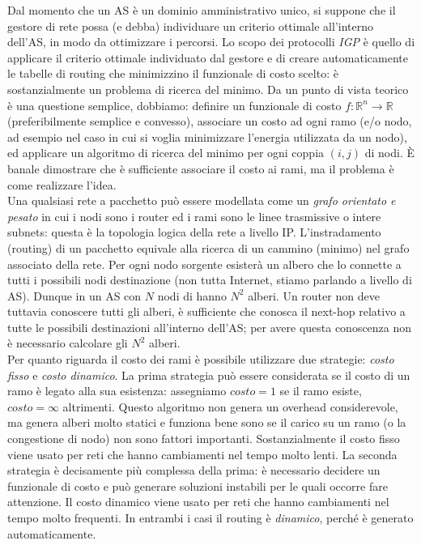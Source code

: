 Dal momento che un AS è un dominio amministrativo unico, si suppone che il gestore di rete possa (e debba) individuare un criterio ottimale all'interno dell'AS, in modo da ottimizzare i percorsi. Lo scopo dei protocolli \textit{IGP} è quello di applicare il criterio ottimale individuato dal gestore e di creare automaticamente le tabelle di routing che minimizzino il funzionale di costo scelto: è sostanzialmente un problema di ricerca del minimo. Da un punto di vista teorico è una questione semplice, dobbiamo: definire un funzionale di costo $f:\mathbb{R}^n\to\mathbb{R}$ (preferibilmente semplice e convesso), associare un costo ad ogni ramo (e/o nodo, ad esempio nel caso in cui si voglia minimizzare l'energia utilizzata da un nodo), ed applicare un algoritmo di ricerca del minimo per ogni coppia $(i,j)$ di nodi. È banale dimostrare che è sufficiente associare il costo ai rami, ma il problema è come realizzare l'idea.\\
Una qualsiasi rete a pacchetto può essere modellata come un \textit{grafo orientato e pesato} in cui i nodi sono i router ed i rami sono le linee trasmissive o intere subnets: questa è la topologia logica della rete a livello IP. L'instradamento (routing) di un pacchetto equivale alla ricerca di un cammino (minimo) nel grafo associato della rete. Per ogni nodo sorgente esisterà un albero che lo connette a tutti i possibili nodi destinazione (non tutta Internet, stiamo parlando a livello di AS). Dunque in un AS con $N$ nodi di hanno $N^2$ alberi. Un router non deve tuttavia conoscere tutti gli alberi, è sufficiente che conosca il next-hop relativo a tutte le possibili destinazioni all'interno dell'AS; per avere questa conoscenza non è necessario calcolare gli $N^2$ alberi.\\
Per quanto riguarda il costo dei rami è possibile utilizzare due strategie: \textit{costo fisso} e \textit{costo dinamico}. La prima strategia può essere considerata se il costo di un ramo è legato alla sua esistenza: assegniamo $costo = 1$ se il ramo esiste, $costo = \infty$ altrimenti. Questo algoritmo non genera un overhead considerevole, ma genera alberi molto statici e funziona bene sono se il carico su un ramo (o la congestione di nodo) non sono fattori importanti. Sostanzialmente il costo fisso viene usato per reti che hanno cambiamenti nel tempo molto lenti. La seconda strategia è decisamente più complessa della prima: è necessario decidere un funzionale di costo e può generare soluzioni instabili per le quali occorre fare attenzione. Il costo dinamico viene usato per reti che hanno cambiamenti nel tempo molto frequenti. In entrambi i casi il routing è \textit{dinamico}, perché è generato automaticamente.\\

